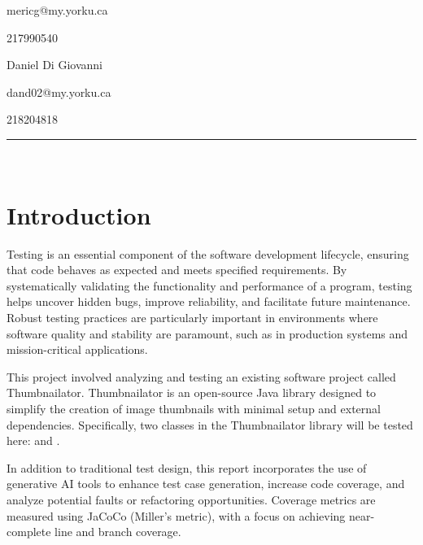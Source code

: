 \documentclass[12pt]{article}
\newcommand*{\sk}{

    \vspace{\baselineskip}

}
\begin{document}
\begin{titlepage}
\begin{spacing}{0.5}
            mericg@my.yorku.ca

            217990540

            \sk
            \sk

            Daniel Di Giovanni

            dand02@my.yorku.ca

            218204818
        \end{spacing}

        \normalsize
        \begin{center}
            \rule{\textwidth}{1pt}\\
        \end{center}


    \end{titlepage}

    \setlength\fboxsep{5pt}
    \setlength{\fboxrule}{1pt}
    \restoregeometry


    {\hypersetup{linkcolor=black}
        \tableofcontents
        \thispagestyle{plain}
    }

    \pagebreak


    \section{Introduction}
    \markboth{}{}

    Testing is an essential component of the software development lifecycle,
        ensuring that code behaves as expected and meets specified requirements.
    By systematically validating the functionality and performance of a program,
        testing helps uncover hidden bugs, improve reliability, and facilitate
        future maintenance.
    Robust testing practices are particularly important in environments where
        software quality and stability are paramount, such as in production
        systems and mission-critical applications.

    This project involved analyzing and testing an existing software project
        called Thumbnailator.
    Thumbnailator is an open-source Java library designed to simplify the
        creation of image thumbnails with minimal setup and external
        dependencies.
    Specifically, two classes in the Thumbnailator library will be tested here:
         and .

    In addition to traditional test design, this report incorporates the use of
        generative AI tools to enhance test case generation, increase code
        coverage, and analyze potential faults or refactoring opportunities.
    Coverage metrics are measured using JaCoCo (Miller's metric), with a focus
        on achieving near-complete line and branch coverage.
\end{document}

